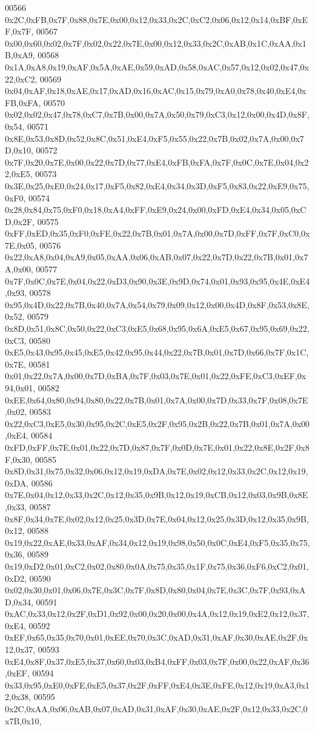 \begin{DoxyCode}
00566 0x2C,0xFB,0x7F,0x88,0x7E,0x00,0x12,0x33,0x2C,0xC2,0x06,0x12,0x14,0xBF,0xEF,0x7F,
00567 0x00,0x60,0x02,0x7F,0x02,0x22,0x7E,0x00,0x12,0x33,0x2C,0xAB,0x1C,0xAA,0x1B,0xA9,
00568 0x1A,0xA8,0x19,0xAF,0x5A,0xAE,0x59,0xAD,0x58,0xAC,0x57,0x12,0x02,0x47,0x22,0xC2,
00569 0x04,0xAF,0x18,0xAE,0x17,0xAD,0x16,0xAC,0x15,0x79,0xA0,0x78,0x40,0xE4,0xFB,0xFA,
00570 0x02,0x02,0x47,0x78,0xC7,0x7B,0x00,0x7A,0x50,0x79,0xC3,0x12,0x00,0x4D,0x8F,0x54,
00571 0x8E,0x53,0x8D,0x52,0x8C,0x51,0xE4,0xF5,0x55,0x22,0x7B,0x02,0x7A,0x00,0x7D,0x10,
00572 0x7F,0x20,0x7E,0x00,0x22,0x7D,0x77,0xE4,0xFB,0xFA,0x7F,0x0C,0x7E,0x04,0x22,0xE5,
00573 0x3E,0x25,0xE0,0x24,0x17,0xF5,0x82,0xE4,0x34,0x3D,0xF5,0x83,0x22,0xE9,0x75,0xF0,
00574 0x28,0x84,0x75,0xF0,0x18,0xA4,0xFF,0xE9,0x24,0x00,0xFD,0xE4,0x34,0x05,0xCD,0x2F,
00575 0xFF,0xED,0x35,0xF0,0xFE,0x22,0x7B,0x01,0x7A,0x00,0x7D,0xFF,0x7F,0xC0,0x7E,0x05,
00576 0x22,0xA8,0x04,0xA9,0x05,0xAA,0x06,0xAB,0x07,0x22,0x7D,0x22,0x7B,0x01,0x7A,0x00,
00577 0x7F,0x0C,0x7E,0x04,0x22,0xD3,0x90,0x3E,0x9D,0x74,0x01,0x93,0x95,0x4E,0xE4,0x93,
00578 0x95,0x4D,0x22,0x7B,0x40,0x7A,0x54,0x79,0x09,0x12,0x00,0x4D,0x8F,0x53,0x8E,0x52,
00579 0x8D,0x51,0x8C,0x50,0x22,0xC3,0xE5,0x68,0x95,0x6A,0xE5,0x67,0x95,0x69,0x22,0xC3,
00580 0xE5,0x43,0x95,0x45,0xE5,0x42,0x95,0x44,0x22,0x7B,0x01,0x7D,0x66,0x7F,0x1C,0x7E,
00581 0x01,0x22,0x7A,0x00,0x7D,0xBA,0x7F,0x03,0x7E,0x01,0x22,0xFE,0xC3,0xEF,0x94,0x01,
00582 0xEE,0x64,0x80,0x94,0x80,0x22,0x7B,0x01,0x7A,0x00,0x7D,0x33,0x7F,0x08,0x7E,0x02,
00583 0x22,0xC3,0xE5,0x30,0x95,0x2C,0xE5,0x2F,0x95,0x2B,0x22,0x7B,0x01,0x7A,0x00,0xE4,
00584 0xFD,0xFF,0x7E,0x01,0x22,0x7D,0x87,0x7F,0x0D,0x7E,0x01,0x22,0x8E,0x2F,0x8F,0x30,
00585 0x8D,0x31,0x75,0x32,0x06,0x12,0x19,0xDA,0x7E,0x02,0x12,0x33,0x2C,0x12,0x19,0xDA,
00586 0x7E,0x04,0x12,0x33,0x2C,0x12,0x35,0x9B,0x12,0x19,0xCB,0x12,0x03,0x9B,0x8E,0x33,
00587 0x8F,0x34,0x7E,0x02,0x12,0x25,0x3D,0x7E,0x04,0x12,0x25,0x3D,0x12,0x35,0x9B,0x12,
00588 0x19,0x22,0xAE,0x33,0xAF,0x34,0x12,0x19,0x98,0x50,0x0C,0xE4,0xF5,0x35,0x75,0x36,
00589 0x19,0xD2,0x01,0xC2,0x02,0x80,0x0A,0x75,0x35,0x1F,0x75,0x36,0xF6,0xC2,0x01,0xD2,
00590 0x02,0x30,0x01,0x06,0x7E,0x3C,0x7F,0x8D,0x80,0x04,0x7E,0x3C,0x7F,0x93,0xAD,0x34,
00591 0xAC,0x33,0x12,0x2F,0xD1,0x92,0x00,0x20,0x00,0x4A,0x12,0x19,0xE2,0x12,0x37,0xE4,
00592 0xEF,0x65,0x35,0x70,0x01,0xEE,0x70,0x3C,0xAD,0x31,0xAF,0x30,0xAE,0x2F,0x12,0x37,
00593 0xE4,0x8F,0x37,0xE5,0x37,0x60,0x03,0xB4,0xFF,0x03,0x7F,0x00,0x22,0xAF,0x36,0xEF,
00594 0x33,0x95,0xE0,0xFE,0xE5,0x37,0x2F,0xFF,0xE4,0x3E,0xFE,0x12,0x19,0xA3,0x12,0x38,
00595 0x2C,0xAA,0x06,0xAB,0x07,0xAD,0x31,0xAF,0x30,0xAE,0x2F,0x12,0x33,0x2C,0x7B,0x10,

\end{DoxyCode}
